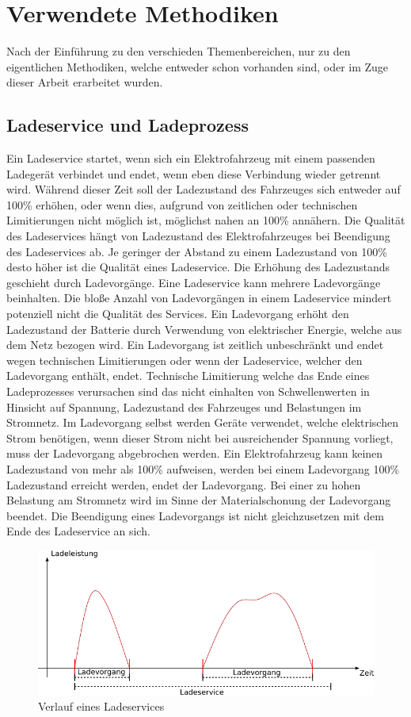 \chapter{Verwendete Methodiken}
Nach der Einführung zu den verschieden Themenbereichen, nur zu den eigentlichen Methodiken, welche entweder schon vorhanden sind, oder im Zuge dieser Arbeit erarbeitet wurden.
\section{Ladeservice und Ladeprozess}
Ein Ladeservice startet, wenn sich ein Elektrofahrzeug mit einem passenden Ladegerät verbindet und endet, wenn eben diese Verbindung wieder getrennt wird. Während dieser Zeit soll der Ladezustand des Fahrzeuges sich entweder auf 100\% erhöhen, oder wenn dies, aufgrund von zeitlichen oder technischen Limitierungen nicht möglich ist, möglichst nahen an 100\% annähern. Die Qualität des Ladeservices hängt von Ladezustand des Elektrofahrzeuges bei Beendigung des Ladeservices ab. Je geringer der Abstand zu einem Ladezustand von 100\% desto höher ist die Qualität eines Ladeservice. Die Erhöhung des Ladezustands geschieht durch Ladevorgänge. Eine Ladeservice kann mehrere Ladevorgänge beinhalten. Die bloße Anzahl von Ladevorgängen in einem Ladeservice mindert potenziell nicht die Qualität des Services. Ein Ladevorgang erhöht den Ladezustand der Batterie durch Verwendung von elektrischer Energie, welche aus dem Netz bezogen wird. Ein Ladevorgang ist zeitlich unbeschränkt und endet wegen technischen Limitierungen oder wenn der Ladeservice, welcher den Ladevorgang enthält, endet. Technische Limitierung welche das Ende eines Ladeprozesses verursachen sind das nicht einhalten von Schwellenwerten in Hinsicht auf Spannung, Ladezustand des Fahrzeuges und Belastungen im Stromnetz. Im Ladevorgang selbst werden Geräte verwendet, welche elektrischen Strom benötigen, wenn dieser Strom nicht bei ausreichender Spannung vorliegt, muss der Ladevorgang abgebrochen werden. Ein Elektrofahrzeug kann keinen Ladezustand von mehr als 100\% aufweisen, werden bei einem Ladevorgang 100\% Ladezustand erreicht werden, endet der Ladevorgang. Bei einer zu hohen Belastung am Stromnetz wird im Sinne der Materialschonung der Ladevorgang beendet. Die Beendigung eines Ladevorgangs ist nicht gleichzusetzen mit dem Ende des Ladeservice an sich. 
\begin{figure}[tb]
	\includegraphics[width=\linewidth]{img/Ladeservice.png}
	\caption{Verlauf eines Ladeservices}
	\label{Abb_Ladeservice}
\end{figure}

